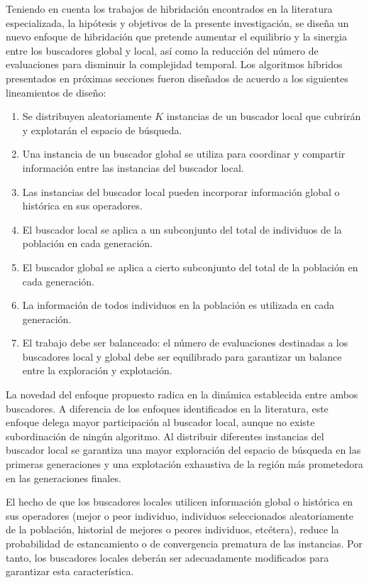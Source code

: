 Teniendo en cuenta los trabajos de hibridación encontrados en la literatura especializada, la hipótesis y objetivos de la presente investigación, se diseña un nuevo enfoque de hibridación que pretende aumentar el equilibrio y la sinergia entre los buscadores global y local, así como la reducción del número de evaluaciones para disminuir la complejidad temporal. Los algoritmos híbridos presentados en próximas secciones fueron diseñados de acuerdo a los siguientes lineamientos de diseño:
\begin{enumerate}
\item Se distribuyen aleatoriamente $K$ instancias de un buscador local que cubrirán y explotarán el espacio de búsqueda.
\item Una instancia de un buscador global se utiliza para coordinar y compartir información entre las instancias del buscador local.
\item Las instancias del buscador local pueden incorporar información global o histórica en sus operadores.
\item El buscador local se aplica a un subconjunto del total de individuos de la población en cada generación.
\item El buscador global se aplica a cierto subconjunto del total de la población en cada generación.
\item La información de todos individuos en la población es utilizada en cada generación.
\item El trabajo debe ser balanceado: el número de evaluaciones destinadas a los buscadores local y global debe ser equilibrado para garantizar un balance entre la exploración y explotación.
\end{enumerate}
\newpage
La novedad del enfoque propuesto radica en la dinámica establecida entre ambos buscadores. A diferencia de los enfoques identificados en la literatura, este enfoque delega mayor participación al buscador local, aunque no existe subordinación de ningún algoritmo. Al distribuir diferentes instancias del buscador local se garantiza una mayor exploración del espacio de búsqueda en las primeras generaciones y una explotación exhaustiva de la región más prometedora en las generaciones finales.

El hecho de que los buscadores locales utilicen información global o histórica en sus operadores (mejor o peor individuo, individuos seleccionados aleatoriamente de la población, historial de mejores o peores individuos, etcétera), reduce la probabilidad de estancamiento o de convergencia prematura de las instancias. Por tanto, los buscadores locales deberán ser adecuadamente modificados para garantizar esta característica. 


